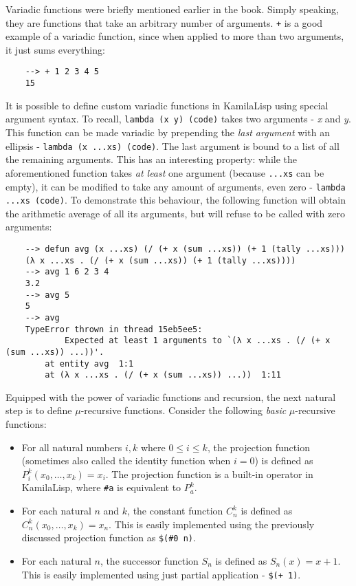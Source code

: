 Variadic functions were briefly mentioned earlier in the book. Simply speaking, they are functions that take an arbitrary number of arguments. \verb|+| is a good example of a variadic function, since when applied to more than two arguments, it just sums everything:

\begin{Verbatim}
    --> + 1 2 3 4 5
    15
\end{Verbatim}

It is possible to define custom variadic functions in KamilaLisp using special argument syntax. To recall, \verb|lambda (x y) (code)| takes two arguments - \textit{x} and \textit{y}. This function can be made variadic by prepending the \textit{last argument} with an ellipsis - \verb|lambda (x ...xs) (code)|. The last argument is bound to a list of all the remaining arguments. This has an interesting property: while the aforementioned function takes \textit{at least} one argument (because \verb|...xs| can be empty), it can be modified to take any amount of arguments, even zero - \verb|lambda ...xs (code)|. To demonstrate this behaviour, the following function will obtain the arithmetic average of all its arguments, but will refuse to be called with zero arguments:

\begin{Verbatim}
    --> defun avg (x ...xs) (/ (+ x (sum ...xs)) (+ 1 (tally ...xs)))
    (λ x ...xs . (/ (+ x (sum ...xs)) (+ 1 (tally ...xs))))
    --> avg 1 6 2 3 4
    3.2
    --> avg 5
    5
    --> avg
    TypeError thrown in thread 15eb5ee5:
            Expected at least 1 arguments to `(λ x ...xs . (/ (+ x (sum ...xs)) ...))'.
        at entity avg  1:1
        at (λ x ...xs . (/ (+ x (sum ...xs)) ...))  1:11
\end{Verbatim}

Equipped with the power of variadic functions and recursion, the next natural step is to define $\mu$-recursive functions. Consider the following \textit{basic} $\mu$-recursive functions:

\begin{itemize}
    \item For all natural numbers $i, k$ where $0 \le i \le k$, the projection function (sometimes also called the identity function when $i=0$) is defined as $P_i^k(x_0, \dots, x_k)=x_i$. The projection function is a built-in operator in KamilaLisp, where \verb|#a| is equivalent to $P_a^k$.
    \item For each natural $n$ and $k$, the constant function $C_n^k$ is defined as $C_n^k(x_0, \dots, x_k) = x_n$. This is easily implemented using the previously discussed projection function as \verb|$(#0 n)|.
    \item For each natural $n$, the successor function $S_n$ is defined as $S_n(x) = x + 1$. This is easily implemented using just partial application - \verb|$(+ 1)|.
\end{itemize}

